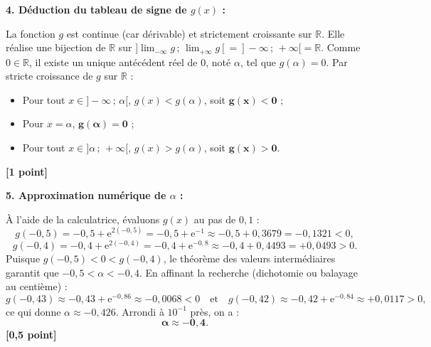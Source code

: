 \documentclass[11pt,a4paper]{article}
\newcommand{\R}{\mathbb{R}}
\newcommand{\e}{\mathrm{e}}
\begin{document}
\begin{correctionbox}
\medskip
\textbf{4. Déduction du tableau de signe de $g(x)$ :}

La fonction $g$ est continue (car dérivable) et strictement croissante sur $\R$.
Elle réalise une bijection de $\R$ sur $]\lim_{-\infty} g\,;\, \lim_{+\infty} g[ = ]-\infty\,;\,+\infty[ = \R$.
Comme $0 \in \R$, il existe un unique antécédent réel de $0$, noté $\alpha$, tel que $g(\alpha) = 0$.
Par stricte croissance de $g$ sur $\R$ :
\begin{itemize}[leftmargin=*]
    \item Pour tout $x \in ]-\infty\,;\,\alpha[$, $g(x) < g(\alpha)$, soit $\mathbf{g(x) < 0}$ ;
    \item Pour $x = \alpha$, $\mathbf{g(\alpha) = 0}$ ;
    \item Pour tout $x \in ]\alpha\,;\,+\infty[$, $g(x) > g(\alpha)$, soit $\mathbf{g(x) > 0}$.
\end{itemize} \hfill \textbf{[1 point]}

\begin{center}
\end{center}

\medskip
\textbf{5. Approximation numérique de $\alpha$ :}

À l'aide de la calculatrice, évaluons $g(x)$ au pas de $0{,}1$ :
\[
g(-0{,}5) = -0{,}5 + \e^{2(-0{,}5)} = -0{,}5 + \e^{-1} \approx -0{,}5 + 0{,}3679 = -0{,}1321 < 0,
\]
\[
g(-0{,}4) = -0{,}4 + \e^{2(-0{,}4)} = -0{,}4 + \e^{-0{,}8} \approx -0{,}4 + 0{,}4493 = +0{,}0493 > 0.
\]
Puisque $g(-0{,}5) < 0 < g(-0{,}4)$, le théorème des valeurs intermédiaires garantit que $-0{,}5 < \alpha < -0{,}4$.
En affinant la recherche (dichotomie ou balayage au centième) :
\[
g(-0{,}43) \approx -0{,}43 + \e^{-0{,}86} \approx -0{,}0068 < 0 \quad \text{et} \quad g(-0{,}42) \approx -0{,}42 + \e^{-0{,}84} \approx +0{,}0117 > 0,
\]
ce qui donne $\alpha \approx -0{,}426$. Arrondi à $10^{-1}$ près, on a :
\[
\mathbf{\alpha \approx -0{,}4}.
\] \hfill \textbf{[0{,}5 point]}


\end{correctionbox}
\end{document}
